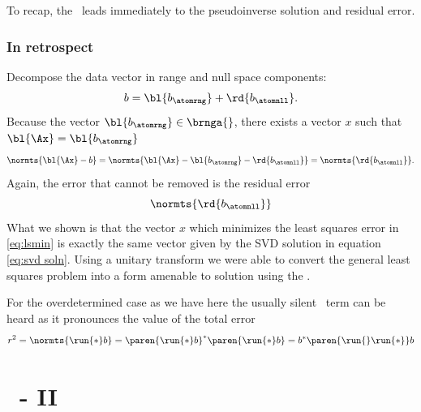 To recap, the \asvd \ leads immediately to the pseudoinverse solution and residual error.

\subsubsection{In retrospect}  %
Decompose the data vector in range and null space components:
  \begin{equation*}   %
    b = \bl{b_{\atomrng}} + \rd{b_{\atomnll}} .
  \end{equation*}
Because the vector $\bl{b_{\atomrng}} \in \brnga{}$, there exists a vector $x$ such that $\bl{\Ax} = \bl{b_{\atomrng}}$ 
  \begin{equation*}   %
    \normts{ \bl{\Ax} - b } = \normts{ \bl{\Ax} - \bl{b_{\atomrng}} - \rd{b_{\atomnll}} } = \normts{ \rd{b_{\atomnll}} }.
  \end{equation*}
Again, the error that cannot be removed is the residual error
  \begin{equation*}   %
    \normts{ \rd{b_{\atomnll}} }
  \end{equation*}
What we shown is that the vector $x$ which minimizes the least squares error in \eqref{eq:lsmin} is exactly the same vector given by the SVD solution in equation \eqref{eq:svd soln}. Using a unitary transform we were able to convert the general least squares problem into a form amenable to solution using the \asvd.

For the overdetermined case as we have here the usually silent \ns \ term can be heard as it pronounces the value of the total error
\begin{equation}
  r^{2} = \normts{ \run{*} b  } = \paren{ \run{*} b  }^{*} \paren{ \run{*} b  } = b^{*} \paren{ \run{}\run{*} } b 
  \label{eq:r2:a}
\end{equation}

\section{\bsvd\ - II}  %
